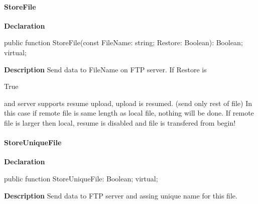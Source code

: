 \documentclass{report}
\newif\ifpdf
\begin{document}
\paragraph*{StoreFile}\hspace*{\fill}

\label{ftpsend.TFTPSend-StoreFile}
\begin{list}{}{
\setlength{\itemindent}{0cm}
\setlength{\listparindent}{0cm}
\setlength{\leftmargin}{\evensidemargin}
\addtolength{\leftmargin}{\tmplength}
\settowidth{\labelsep}{X}
\addtolength{\leftmargin}{\labelsep}
\setlength{\labelwidth}{\tmplength}
}
\item[\textbf{Declaration}\hfill]
\ifpdf
\begin{flushleft}
\fi
\begin{ttfamily}
public function StoreFile(const FileName: string; Restore: Boolean): Boolean; virtual;\end{ttfamily}

\ifpdf
\end{flushleft}
\fi

\par
\item[\textbf{Description}]
Send data to FileName on FTP server. If Restore is \begin{ttfamily}True\end{ttfamily} and server supports resume upload, upload is resumed. (send only rest of file) In this case if remote file is same length as local file, nothing will be done. If remote file is larger then local, resume is disabled and file is transfered from begin!

\end{list}
\paragraph*{StoreUniqueFile}\hspace*{\fill}

\label{ftpsend.TFTPSend-StoreUniqueFile}
\begin{list}{}{
\setlength{\itemindent}{0cm}
\setlength{\listparindent}{0cm}
\setlength{\leftmargin}{\evensidemargin}
\addtolength{\leftmargin}{\tmplength}
\settowidth{\labelsep}{X}
\addtolength{\leftmargin}{\labelsep}
\setlength{\labelwidth}{\tmplength}
}
\item[\textbf{Declaration}\hfill]
\ifpdf
\begin{flushleft}
\fi
\begin{ttfamily}
public function StoreUniqueFile: Boolean; virtual;\end{ttfamily}

\ifpdf
\end{flushleft}
\fi

\par
\item[\textbf{Description}]
Send data to FTP server and assing unique name for this file.

\end{list}
\end{document}
